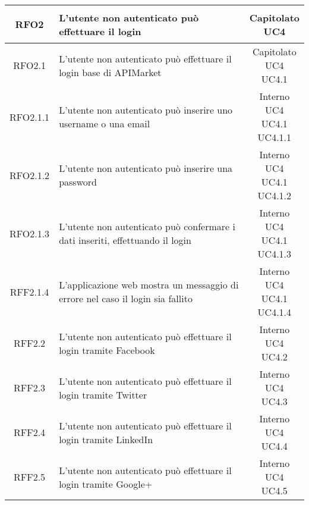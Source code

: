 \begin{longtable}{|c|p{8cm}|c|}
\hypertarget{RFO2}{RFO2} & L'utente non autenticato può effettuare il login & \makecell*{Capitolato\\UC4} \\
\hline

\hypertarget{RFO2.1}{RFO2.1} & L'utente non autenticato può effettuare il login base di APIMarket & \makecell*{Capitolato\\UC4\\UC4.1} \\
\hline

\hypertarget{RFO2.1.1}{RFO2.1.1} & L'utente non autenticato può inserire uno username o una email & \makecell*{Interno\\UC4\\UC4.1\\UC4.1.1} \\
\hline
\hypertarget{RFO2.1.2}{RFO2.1.2} & L'utente non autenticato può inserire una password & \makecell*{Interno\\UC4\\UC4.1\\UC4.1.2} \\
\hline
\hypertarget{RFO2.1.3}{RFO2.1.3} & L'utente non autenticato può confermare i dati inseriti, effettuando il login & \makecell*{Interno\\UC4\\UC4.1\\UC4.1.3} \\
\hline
\hypertarget{RFF2.1.4}{RFF2.1.4} & L'applicazione web mostra un messaggio di errore nel caso il login sia fallito & \makecell*{Interno\\UC4\\UC4.1\\UC4.1.4} \\
\hline

\hypertarget{RFF2.2}{RFF2.2} & L'utente non autenticato può effettuare il login tramite Facebook & \makecell*{Interno\\UC4\\UC4.2} \\
\hline
\hypertarget{RFF2.3}{RFF2.3} & L'utente non autenticato può effettuare il login tramite Twitter & \makecell*{Interno\\UC4\\UC4.3} \\
\hline
\hypertarget{RFF2.4}{RFF2.4} & L'utente non autenticato può effettuare il login tramite LinkedIn & \makecell*{Interno\\UC4\\UC4.4} \\
\hline
\hypertarget{RFF2.5}{RFF2.5} & L'utente non autenticato può effettuare il login tramite Google+ & \makecell*{Interno\\UC4\\UC4.5} \\
\hline


\end{longtable}
